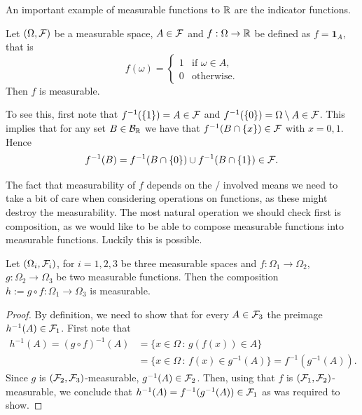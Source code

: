 An important example of measurable functions to $\mathbb R$ are the indicator functions.

\begin{example}
Let $(\Omega,\mathcal F)$ be a measurable space, $A \in \mathcal F$ and $f : \Omega \to \mathbb R$ be defined as $f = \mathbf{1}_A$, that is 
\[
	f(\omega) = \begin{cases}
		1 &\text{if } \omega \in A,\\
		0 &\text{otherwise.}
	\end{cases}
\]
Then $f$ is measurable.

To see this, first note that $f^{-1}(\{1\}) = A \in \mathcal F$ and $f^{-1}(\{0\}) = \Omega\setminus A \in \mathcal F$. This implies that for any set $B \in \mathcal B_{\mathbb R}$ we have that $f^{-1}(B \cap \{x\}) \in \mathcal F$ with $x = 0, 1$. Hence
\[
	f^{-1}(B) = f^{-1}(B \cap \{0\}) \cup f^{-1}(B \cap \{1\}) \in \mathcal F.
\]
\end{example}

The fact that measurability of $f$ depends on the \sigalgs/ involved means we need to take a bit of care when considering operations on functions, as these might destroy the measurability. The most natural operation we should check first is composition, as we would like to be able to compose measurable functions into measurable functions. Luckily this is possible.

\begin{proposition}
Let $(\Omega_i, \mathcal F_i)$, for $i = 1,2,3$ be three measurable spaces and $f : \Omega_1 \to \Omega_2$, $g : \Omega_2 \to \Omega_3$ be two measurable functions. Then the composition $h := g \circ f : \Omega_1 \to \Omega_3$ is measurable.
\end{proposition}

\begin{proof}
By definition, we need to show that for every $A \in \mathcal F_3$ the preimage $h^{-1}(A) \in \mathcal F_1$. First note that
\begin{align*}
	h^{-1}(A) = (g\circ f)^{-1}(A) &= \{x \in \Omega \, : \, g(f(x)) \in A\} \\
	&= \{x \in \Omega \, : \, f(x) \in g^{-1}(A) \} = f^{-1}(g^{-1}(A)).
\end{align*}
Since $g$ is $(\mathcal F_2, \mathcal F_3)$-measurable, $g^{-1}(A) \in \mathcal F_2$. Then, using that $f$ is $(\mathcal F_1, \mathcal F_2)$-measurable, we conclude that $h^{-1}(A) = f^{-1}(g^{-1}(A)) \in \mathcal F_1$ as was required to show.
\end{proof}

